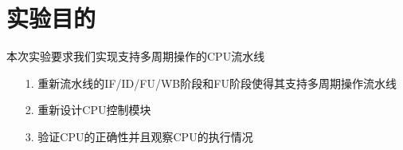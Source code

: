 \section{实验目的}
本次实验要求我们实现支持多周期操作的CPU流水线
\begin{itemize}
    \item [1.] 重新流水线的IF/ID/FU/WB阶段和FU阶段使得其支持多周期操作流水线
    \item [2.] 重新设计CPU控制模块
    \item [3.] 验证CPU的正确性并且观察CPU的执行情况
\end{itemize}    